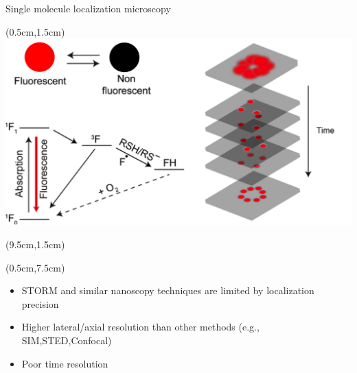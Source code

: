 \documentclass{beamer}					%
\begin{document}
\begin{frame}{Single molecule localization microscopy}
\begin{textblock*}{9cm}(0.5cm,1.5cm)
\includegraphics[width=\textwidth]{../../phd/dissertation/dissertation/media/Intro-Cropped.png}
\end{textblock*}
\begin{textblock*}{5cm}(9.5cm,1.5cm)
\end{textblock*}
\begin{textblock*}{15cm}(0.5cm,7.5cm)
\begin{itemize}
\item STORM and similar nanoscopy techniques are limited by localization precision
\item Higher lateral/axial resolution than other methods (e.g., SIM,STED,Confocal)
\item Poor time resolution
\end{itemize}
\end{textblock*}
\end{frame}
\end{document}
